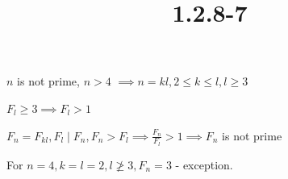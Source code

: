 \documentclass{article}
\title{1.2.8-7}
\begin{document}
\maketitle

\( n \) is not prime, \( n > 4 \) \( \implies n = kl, 2 \leq k \leq l, l \geq 3 \)

\( F_l \geq 3 \implies F_l > 1 \)

\( F_n = F_{kl}, F_l \mid F_{n}, F_n > F_l \implies \frac{F_n}{F_l} > 1 \implies F_n \) is not prime

For \( n = 4, k=l=2, l \not \geq 3, F_n = 3 \) - exception.
\end{document}
